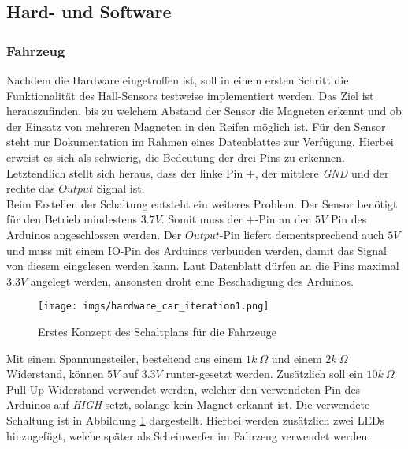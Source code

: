 \documentclass[.../Dokumentation.tex]{subfiles}
\begin{document}
\subsection{Hard- und Software}
\label{sec-ita1-hardware}

\subsubsection*{Fahrzeug}
Nachdem die Hardware eingetroffen ist, soll in einem ersten Schritt 
die Funktionalität des Hall-Sensors testweise implementiert werden. Das Ziel 
ist herauszufinden, bis zu welchem Abstand der Sensor die Magneten erkennt und 
ob der Einsatz von mehreren Magneten in den Reifen möglich ist. Für den Sensor 
steht nur Dokumentation im Rahmen eines Datenblattes zur Verfügung. Hierbei erweist es sich als schwierig, die Bedeutung der drei Pins zu 
erkennen. Letztendlich stellt sich heraus, dass der linke Pin $+$, der 
mittlere \textit{GND} und der rechte das $Output$ Signal ist.\\
Beim Erstellen der Schaltung entsteht ein weiteres Problem. Der Sensor benötigt für den Betrieb mindestens $3.7V$. Somit muss der $+$-Pin an den $5V$ Pin des 
Arduinos angeschlossen werden. Der $Output$-Pin liefert dementsprechend auch $5V$ und muss mit einem IO-Pin des Arduinos verbunden werden, damit das 
Signal von diesem eingelesen werden kann. Laut Datenblatt dürfen an die Pins maximal $3.3V$ angelegt werden, ansonsten droht eine Beschädigung des Arduinos.
\begin{figure}[H]
\begin{center}
    \texttt{[image: imgs/hardware\_car\_iteration1.png]}
    \caption{Erstes Konzept des Schaltplans für die Fahrzeuge}
    \label{fig-hardware-car-iteration1}
\end{center}
\end{figure}
\noindent
Mit einem Spannungsteiler, bestehend aus einem $1k\ \Omega$ und einem $2k\ \Omega$ Widerstand, können $5V$ 
auf $3.3V$ runter-gesetzt werden. Zusätzlich soll ein 
$10k\ \Omega$ Pull-Up Widerstand verwendet werden, welcher den verwendeten Pin 
des Arduinos auf \textit{HIGH} setzt, solange kein Magnet erkannt ist. Die verwendete Schaltung ist in Abbildung \ref{fig-hardware-car-iteration1} dargestellt. 
Hierbei werden zusätzlich zwei LEDs hinzugefügt, welche später als Scheinwerfer im Fahrzeug verwendet werden. 
\end{document}
